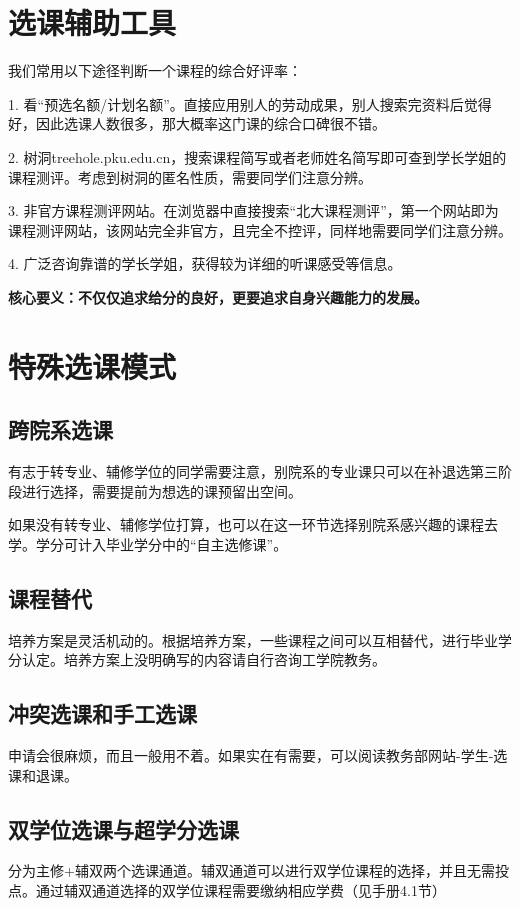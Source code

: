 \documentclass[11pt,oneside]{book}
\begin{document}
\section{选课辅助工具}
我们常用以下途径判断一个课程的综合好评率：

1. 看“预选名额/计划名额”。直接应用别人的劳动成果，别人搜索完资料后觉得好，因此选课人数很多，那大概率这门课的综合口碑很不错。

2. 树洞treehole.pku.edu.cn，搜索课程简写或者老师姓名简写即可查到学长学姐的课程测评。考虑到树洞的匿名性质，需要同学们注意分辨。

3. 非官方课程测评网站。在浏览器中直接搜索“北大课程测评”，第一个网站即为课程测评网站，该网站完全非官方，且完全不控评，同样地需要同学们注意分辨。

4. 广泛咨询靠谱的学长学姐，获得较为详细的听课感受等信息。

\textbf{核心要义：不仅仅追求给分的良好，更要追求自身兴趣能力的发展。}

\section{特殊选课模式}
\subsection{跨院系选课}
有志于转专业、辅修学位的同学需要注意，别院系的专业课只可以在补退选第三阶段进行选择，需要提前为想选的课预留出空间。

如果没有转专业、辅修学位打算，也可以在这一环节选择别院系感兴趣的课程去学。学分可计入毕业学分中的“自主选修课”。

\subsection{课程替代}
培养方案是灵活机动的。根据培养方案，一些课程之间可以互相替代，进行毕业学分认定。培养方案上没明确写的内容请自行咨询工学院教务。

\subsection{冲突选课和手工选课}
申请会很麻烦，而且一般用不着。如果实在有需要，可以阅读教务部网站-学生-选课和退课。

\subsection{双学位选课与超学分选课}
分为主修+辅双两个选课通道。辅双通道可以进行双学位课程的选择，并且无需投点。通过辅双通道选择的双学位课程需要缴纳相应学费（见手册4.1节）
\end{document}
